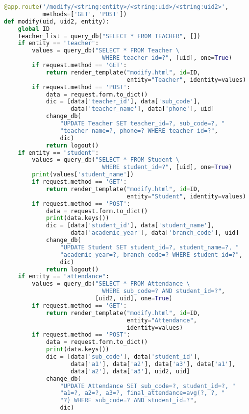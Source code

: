 \begin{lstlisting}[language=python]
@app.route('/modify/<string:entity>/<string:uid>/<string:uid2>',
           methods=['GET', 'POST'])
def modify(uid, uid2, entity):
    global ID
    teacher_list = query_db("SELECT * FROM TEACHER", [])
    if entity == "teacher":
        values = query_db("SELECT * FROM Teacher \
                            WHERE teacher_id=?", [uid], one=True)
        if request.method == 'GET':
            return render_template("modify.html", id=ID,
                                   entity="Teacher", identity=values)
        if request.method == 'POST':
            data = request.form.to_dict()
            dic = [data['teacher_id'], data['sub_code'],
                   data['teacher_name'], data['phone'], uid]
            change_db(
                "UPDATE Teacher SET teacher_id=?, sub_code=?, "
                "teacher_name=?, phone=? WHERE teacher_id=?",
                dic)
            return logout()
    if entity == "student":
        values = query_db("SELECT * FROM Student \
                            WHERE student_id=?", [uid], one=True)
        print(values['student_name'])
        if request.method == 'GET':
            return render_template("modify.html", id=ID,
                                   entity="Student", identity=values)
        if request.method == 'POST':
            data = request.form.to_dict()
            print(data.keys())
            dic = [data['student_id'], data['student_name'],
                   data['academic_year'], data['branch_code'], uid]
            change_db(
                "UPDATE Student SET student_id=?, student_name=?, "
                "academic_year=?, branch_code=? WHERE student_id=?",
                dic)
            return logout()
    if entity == "attendance":
        values = query_db("SELECT * FROM Attendance \
                            WHERE sub_code=? AND student_id=?",
                          [uid2, uid], one=True)
        if request.method == 'GET':
            return render_template("modify.html", id=ID,
                                   entity="Attendance",
                                   identity=values)
        if request.method == 'POST':
            data = request.form.to_dict()
            print(data.keys())
            dic = [data['sub_code'], data['student_id'],
                   data['a1'], data['a2'], data['a3'], data['a1'],
                   data['a2'], data['a3'], uid2, uid]
            change_db(
                "UPDATE Attendance SET sub_code=?, student_id=?, "
                "a1=?, a2=?, a3=?, final_attendance=avg(?, ?, "
                "?) WHERE sub_code=? AND student_id=?",
                dic)

\end{lstlisting}
